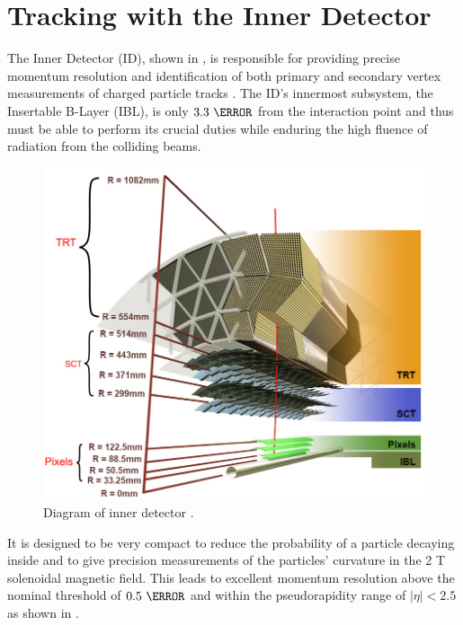 \section{Tracking with the Inner Detector} \label{sec:atlas:tracking}

The Inner Detector (ID), shown in , is
responsible for providing precise momentum resolution and identification of
both primary and secondary vertex measurements of charged particle tracks
\cite{ATLAS-TDR-4,ATLAS-TDR-5}.  The ID's innermost subsystem, the Insertable
B-Layer (IBL), is only $3.3~\cm$ from the interaction point
\cite{Potamianos:2209070} and thus must be able to perform its crucial duties
while enduring the high fluence of radiation from the colliding beams.

\begin{figure}[!htbp]
  \begin{center}
    \includegraphics[width=0.8\linewidth]{figures/atlas/inner_detector_diagram}
    \caption{Diagram of inner detector \cite{Potamianos:2209070}.}
    \label{fig:inner_detector_diagram}
  \end{center}
\end{figure}

It is designed to be very compact to reduce the probability of a particle
decaying inside and to give precision measurements of the particles' curvature in
the 2 T solenoidal magnetic field. This leads to excellent momentum resolution
above the nominal \pT threshold of $0.5~\GeV$ and within the pseudorapidity range
of $|\eta| < 2.5$ as shown in .

